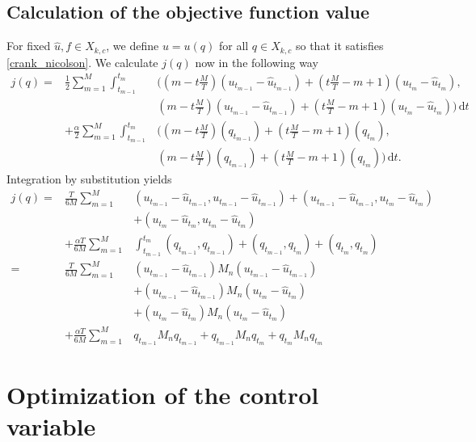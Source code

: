 \subsection{Calculation of the objective function value}
For fixed $\hat{u},f\in X_{k,c}$, we define $u=u(q)$ for all $q\in X_{k,c}$ so that it satisfies \eqref{crank_nicolson}. We calculate $j(q)$ now in the following way
\begin{eqnarray*}
j(q) =& \frac{1}{2}\sum_{m=1}^M\int_{t_{m-1}}^{t_m}&\bigg(\left(m-t\frac{M}{T}\right) \left(u_{t_{m-1}}-\hat{u}_{t_{m-1}}\right)+\left(t\frac{M}{T}-m+1\right) \left(u_{t_{m}}-\hat{u}_{t_{m}}\right),\\
&&\left(m-t\frac{M}{T}\right) \left(u_{t_{m-1}}-\hat{u}_{t_{m-1}}\right)+\left(t\frac{M}{T}-m+1\right) \left(u_{t_{m}}-\hat{u}_{t_{m}}\right)\bigg)\,\mathrm{d}t\\
&+ \frac{\alpha}{2}\sum_{m=1}^M\int_{t_{m-1}}^{t_m}&\bigg(\left(m-t\frac{M}{T}\right) \left(q_{t_{m-1}}\right)+\left(t\frac{M}{T}-m+1\right) \left(q_{t_{m}}\right),\\
&&\left(m-t\frac{M}{T}\right) \left(q_{t_{m-1}}\right)+\left(t\frac{M}{T}-m+1\right) \left(q_{t_{m}}\right)\bigg)\,\mathrm{d}t.
\end{eqnarray*}
Integration by substitution yields
\begin{eqnarray*}
j(q) =& \frac{T}{6M}\sum_{m=1}^M&\left(u_{t_{m-1}}-\hat{u}_{t_{m-1}},u_{t_{m-1}}-\hat{u}_{t_{m-1}}\right) + \left(u_{t_{m-1}}-\hat{u}_{t_{m-1}},u_{t_{m}}-\hat{u}_{t_{m}}\right)\\
&&+ \left(u_{t_{m}}-\hat{u}_{t_{m}},u_{t_{m}}-\hat{u}_{t_{m}}\right)\\
&+ \frac{\alpha T}{6M}\sum_{m=1}^M&\int_{t_{m-1}}^{t_m}\left(q_{t_{m-1}},q_{t_{m-1}}\right) + \left(q_{t_{m-1}},q_{t_{m}}\right) + \left(q_{t_{m}},q_{t_{m}}\right)\\
=& \frac{T}{6M}\sum_{m=1}^M&\left(u_{t_{m-1}}-\hat{u}_{t_{m-1}}\right)M_n\left(u_{t_{m-1}}-\hat{u}_{t_{m-1}}\right)\\
&&+ \left(u_{t_{m-1}}-\hat{u}_{t_{m-1}}\right)M_n\left(u_{t_{m}}-\hat{u}_{t_{m}}\right)\\
&&+ \left(u_{t_{m}}-\hat{u}_{t_{m}}\right)M_n\left(u_{t_{m}}-\hat{u}_{t_{m}}\right)\\
&+ \frac{\alpha T}{6M}\sum_{m=1}^M&q_{t_{m-1}}M_nq_{t_{m-1}} + q_{t_{m-1}}M_nq_{t_{m}} + q_{t_{m}}M_nq_{t_{m}}
\end{eqnarray*}

\section{Optimization of the control variable}

